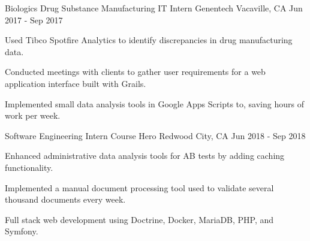 

\begin{cventries}

  \cventry
  {Biologics Drug Substance Manufacturing IT Intern} %
  {Genentech} %
  {Vacaville, CA} %
  {Jun 2017 - Sep 2017} %
  {
  \begin{cvitems} %
    \item {Used Tibco Spotfire Analytics to identify discrepancies in drug manufacturing data.}
    \item {Conducted meetings with clients to gather user requirements for a web application interface built with Grails.}
    \item {Implemented small data analysis tools in Google Apps Scripts to, saving hours of work per week.}
  \end{cvitems}
  }

  \cventry
  {Software Engineering Intern}
  {Course Hero}
  {Redwood City, CA}
  {Jun 2018 - Sep 2018}
  {
  \begin{cvitems}
    \item {Enhanced administrative data analysis tools for AB tests by adding caching functionality.}
    \item {Implemented a manual document processing tool used to validate several thousand documents every week.}
    \item {Full stack web development using Doctrine, Docker, MariaDB, PHP, and Symfony.}
  \end{cvitems}
  }
\end{cventries}
